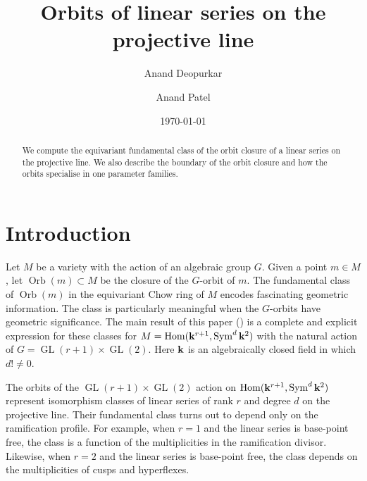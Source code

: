 \documentclass[11pt]{amsart}
\author{Anand Deopurkar}
\author{Anand Patel}
\date{\today}
\title{Orbits of linear series on the projective line}
\providecommand{\GL}{\operatorname{GL}}
\providecommand{\Hom}{\operatorname{Hom}}
\providecommand{\Sym}{\operatorname{Sym}}
\DeclareMathOperator{\Orb}{Orb}
\begin{document}
\maketitle

\begin{abstract}
  We compute the equivariant fundamental class of the orbit closure of a linear series on the projective line.
  We also describe the boundary of the orbit closure and how the orbits specialise in one parameter families.
\end{abstract}


\section{Introduction}
Let \(M\) be a variety with the action of an algebraic group \(G\).
Given a point \(m \in M\), let \(\Orb(m) \subset M\) be the closure of the \(G\)-orbit of \(m\).
The fundamental class of \(\Orb(m)\) in the equivariant Chow ring of \(M\) encodes fascinating geometric information.
The class is particularly meaningful when the \(G\)-orbits have geometric significance.
The main result of this paper () is a complete and explicit expression for these classes for \(M = \Hom(\k^{r+1}, \Sym^d \k^2)\) with the natural action of \(G = \GL(r+1) \times \GL(2)\).
Here \(\mathbf k\) is an algebraically closed field in which \(d! \neq 0\).

The orbits of the \(\GL(r+1) \times \GL(2)\) action on \(\Hom(\k^{r+1}, \Sym^d \k^2)\) represent isomorphism classes of linear series of rank \(r\) and degree \(d\) on the projective line.
Their fundamental class turns out to depend only on the ramification profile.
For example, when \(r = 1\) and the linear series is base-point free, the class is a function of the multiplicities in the ramification divisor.
Likewise, when \(r = 2\) and the linear series is base-point free, the class depends on the multiplicities of cusps and hyperflexes.
\end{document}
